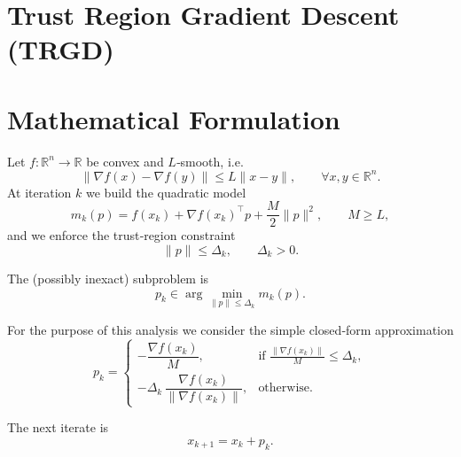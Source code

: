 \documentclass{article}
\begin{document}
\section*{Trust Region Gradient Descent (TRGD)}

\section*{Mathematical Formulation}
Let $f:\mathbb{R}^n\rightarrow\mathbb{R}$ be convex and $L$‑smooth, i.e.
\[
\|\nabla f(x)-\nabla f(y)\|\le L \|x-y\|,\qquad \forall x,y\in\mathbb{R}^n .
\tag{1}
\]
At iteration $k$ we build the quadratic model
\[
m_k(p)=f(x_k)+\nabla f(x_k)^{\!\top}p+\frac{M}{2}\|p\|^{2},
\qquad M\ge L,
\tag{2}
\]
and we enforce the trust‑region constraint
\[
\|p\|\le \Delta_k,\qquad \Delta_k>0 .
\tag{3}
\]

The (possibly inexact) subproblem is
\[
p_k\in\arg\min_{\|p\|\le\Delta_k} m_k(p).
\tag{4}
\]

For the purpose of this analysis we consider the simple closed‑form
approximation
\[
\boxed{
p_k=
\begin{cases}
-\dfrac{\nabla f(x_k)}{M}, & \text{if }\displaystyle \frac{\|\nabla f(x_k)\|}{M}\le \Delta_k,\\[2ex]
-\Delta_k\,\dfrac{\nabla f(x_k)}{\|\nabla f(x_k)\|}, & \text{otherwise.}
\end{cases}}
\tag{5}
\]

The next iterate is
\[
x_{k+1}=x_k+p_k .
\tag{6}
\]
\end{document}
